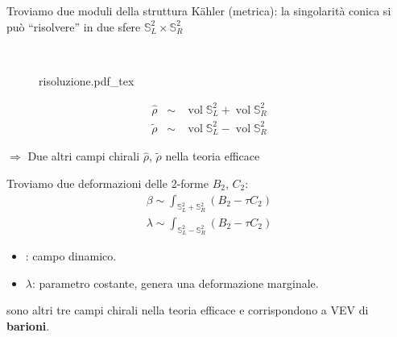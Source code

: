 \documentclass[aspectratio=43,mathserif]{beamer}
\newcommand{\ess}{\mathbb{S}}
\newcommand{\hatt}[1]{\ensuremath{\widehat{#1}}}
\newcommand{\tildd}[1]{\ensuremath{\widetilde{#1}}}
\newcommand{\vol}{\ensuremath{\operatorname{vol}}}
\begin{document}
\begin{frame}
	Troviamo due moduli della struttura K\"ahler (metrica): la singolarità conica si può ``risolvere'' in due sfere $\ess^2_L \times \ess^2_R$

	~\\

	\begin{figure}[h!]\centering
		\def\svgscale{0.5}
	{risoluzione.pdf_tex}
	\end{figure}

	\vspace{-20pt}

	\begin{align}
		\hatt\rho \;\; \sim\;\;  \vol \ess^2_L + \vol \ess^2_R\\
		\tildd\rho \;\; \sim\;\;  \vol \ess^2_L - \vol \ess^2_R
	\end{align}

	\vfill

	$\Rightarrow$ Due altri campi chirali {\Large $\hatt\rho$, $\tildd\rho$} nella teoria efficace
	
\end{frame}

\begin{frame}
	Troviamo due deformazioni delle 2-forme $B_2$, $C_2$:
\vfill
\vspace{-10pt}
	\begin{align}
		\beta \sim \int_{\ess^2_L + \ess^2_R} \left( B_2 - \tau C_2  \right)\\
		\lambda \sim \int_{\ess^2_L - \ess^2_R} \left(B_2 - \tau C_2\right)
		\label{}
	\end{align}

	\vfill	
	\begin{itemize}
		\item	\scalebox{1.2}{$\beta$}: campo dinamico. 
		\item $\lambda$:  parametro costante, genera una deformazione marginale.
	\end{itemize}

\vfill
\scalebox{1.2}{$\hatt\rho$, $\tildd\rho$, $\beta$} sono altri tre campi chirali nella teoria efficace e corrispondono a VEV di \textbf{barioni}.
\end{frame}
\end{document}
